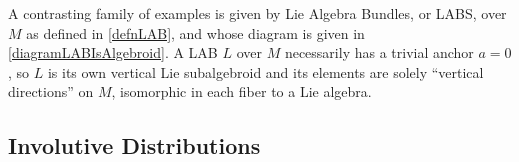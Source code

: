 A contrasting family of examples is given by Lie Algebra Bundles, or LABS, over $M$ as defined in \ref{defnLAB}, and whose diagram is given in \eqref{diagramLABIsAlgebroid}. A LAB $L$ over $M$ necessarily has a trivial anchor $a = 0$, so $L$ is its own vertical Lie subalgebroid and its elements are solely ``vertical directions'' on $M$, isomorphic in each fiber to a Lie algebra.






\subsection{Involutive Distributions}



